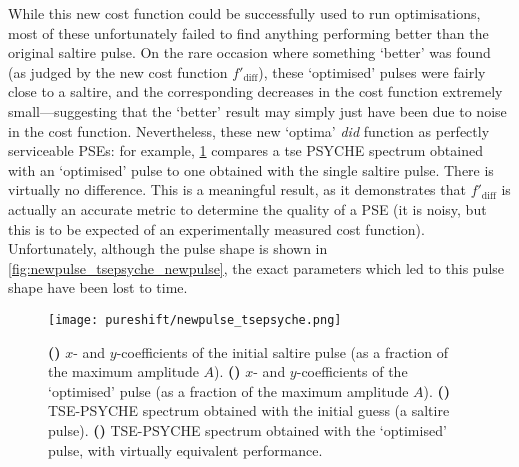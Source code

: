 While this new cost function could be successfully used to run optimisations, most of these unfortunately failed to find anything performing better than the original saltire pulse.
On the rare occasion where something `better' was found (as judged by the new cost function $f'_\text{diff}$), these `optimised' pulses were fairly close to a saltire, and the corresponding decreases in the cost function extremely small---suggesting that the `better' result may simply just have been due to noise in the cost function.
Nevertheless, these new `optima' \textit{did} function as perfectly serviceable PSEs: for example, \cref{fig:newpulse_tsepsyche} compares a \ac{tse} PSYCHE spectrum obtained with an `optimised' pulse to one obtained with the single saltire pulse.
There is virtually no difference.
This is a meaningful result, as it demonstrates that $f'_\text{diff}$ is actually an accurate metric to determine the quality of a PSE (it is noisy, but this is to be expected of an experimentally measured cost function).
Unfortunately, although the pulse shape is shown in \cref{fig:newpulse_tsepsyche_newpulse}, the exact parameters which led to this pulse shape have been lost to time.

\begin{figure}[htb]
    \centering
    \texttt{[image: pureshift/newpulse\_tsepsyche.png]}%
    {\label{fig:newpulse_tsepsyche_saltire}}%
    {\label{fig:newpulse_tsepsyche_newpulse}}%
    {\label{fig:newpulse_tsepsyche_saltirespec}}%
    {\label{fig:newpulse_tsepsyche_newpulsespec}}%
    \caption[Evaluation of an `optimised' pulse in a TSE-PSYCHE experiment]{
        \textbf{()} $x$- and $y$-coefficients of the initial saltire pulse (as a fraction of the maximum amplitude $A$).
        \textbf{()} $x$- and $y$-coefficients of the `optimised' pulse (as a fraction of the maximum amplitude $A$).
        \textbf{()} TSE-PSYCHE spectrum obtained with the initial guess (a saltire pulse).
        \textbf{()} TSE-PSYCHE spectrum obtained with the `optimised' pulse, with virtually equivalent performance.
    }
    \label{fig:newpulse_tsepsyche}
\end{figure}

